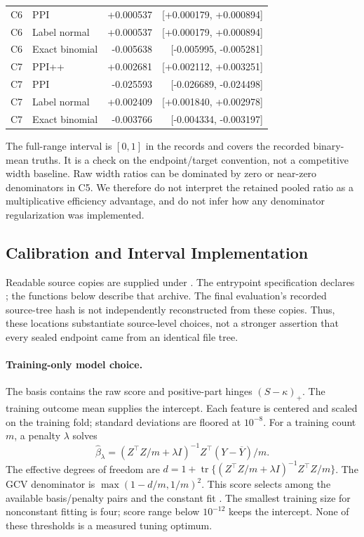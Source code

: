 \documentclass{article}
\begin{document}
\begin{longtable}{llrr}
C6 & PPI & +0.000537 & [+0.000179, +0.000894] \\
C6 & Label normal & +0.000537 & [+0.000179, +0.000894] \\
C6 & Exact binomial & -0.005638 & [-0.005995, -0.005281] \\
\midrule
C7 & PPI++ & +0.002681 & [+0.002112, +0.003251] \\
C7 & PPI & -0.025593 & [-0.026689, -0.024498] \\
C7 & Label normal & +0.002409 & [+0.001840, +0.002978] \\
C7 & Exact binomial & -0.003766 & [-0.004334, -0.003197] \\
\midrule
\bottomrule
\end{longtable}

The full-range interval is $[0,1]$ in the records and covers the recorded binary-mean truths. It is a check on the endpoint/target convention, not a competitive width baseline. Raw width ratios can be dominated by zero or near-zero denominators in C5. We therefore do not interpret the retained pooled ratio as a multiplicative efficiency advantage, and do not infer how any denominator regularization was implemented.

\subsection{Calibration and Interval Implementation}
\label{sec:implementation}
Readable source copies are supplied under . The entrypoint specification declares ; the functions below describe that archive. The final evaluation's recorded source-tree hash is not independently reconstructed from these copies. Thus, these locations substantiate source-level choices, not a stronger assertion that every sealed endpoint came from an identical file tree.

\paragraph{Training-only model choice.}
The basis contains the raw score and positive-part hinges $(S-\kappa)_+$. The training outcome mean supplies the intercept. Each feature is centered and scaled on the training fold; standard deviations are floored at $10^{-8}$. For a training count $m$, a penalty $\lambda$ solves
\begin{equation}
\widehat\beta_\lambda=(Z^\top Z/m+\lambda I)^{-1}Z^\top(Y-\overline Y)/m.
\end{equation}
The effective degrees of freedom are $d=1+\operatorname{tr}\{(Z^\top Z/m+\lambda I)^{-1}Z^\top Z/m\}$. The GCV denominator is $\max(1-d/m,1/m)^2$. This score selects among the available basis/penalty pairs and the constant fit \citep{HoerlKennard1970,Golub1979GCV}. The smallest training size for nonconstant fitting is four; score range below $10^{-12}$ keeps the intercept. None of these thresholds is a measured tuning optimum.
\end{document}
